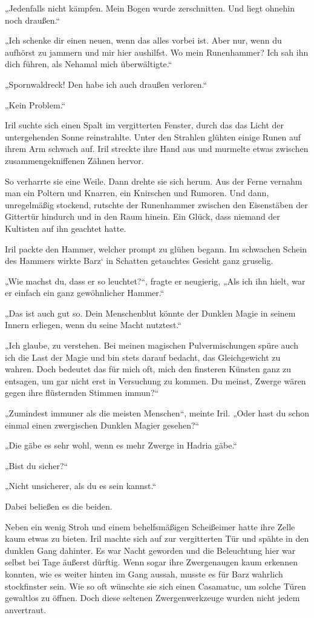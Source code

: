 „Jedenfalls nicht kämpfen. Mein Bogen wurde zerschnitten. Und liegt ohnehin noch draußen.“

„Ich schenke dir einen neuen, wenn das alles vorbei ist. Aber nur, wenn du aufhörst zu jammern und mir hier aushilfst. Wo mein Runenhammer? Ich sah ihn dich führen, als Nehamal mich überwältigte.“

„Spornwaldreck! Den habe ich auch draußen verloren.“

„Kein Problem.“

Iril suchte sich einen Spalt im vergitterten Fenster, durch das das Licht der untergehenden Sonne reinstrahlte. Unter den Strahlen glühten einige Runen auf ihrem Arm schwach auf. Iril streckte ihre Hand aus und murmelte etwas zwischen zusammengekniffenen Zähnen hervor.

So verharrte sie eine Weile. Dann drehte sie sich herum. Aus der Ferne vernahm man ein Poltern und Knarren, ein Knirschen und Rumoren. Und dann, unregelmäßig stockend, rutschte der Runenhammer zwischen den Eisenstäben der Gittertür hindurch und in den Raum hinein. Ein Glück, dass niemand der Kultisten auf ihn geachtet hatte.

Iril packte den Hammer, welcher prompt zu glühen begann. Im schwachen Schein des Hammers wirkte Barz‘ in Schatten getauchtes Gesicht ganz gruselig.

„Wie machst du, dass er so leuchtet?“, fragte er neugierig, „Als ich ihn hielt, war er einfach ein ganz gewöhnlicher Hammer.“

„Das ist auch gut so. Dein Menschenblut könnte der Dunklen Magie in seinem Innern erliegen, wenn du seine Macht nutztest.“

„Ich glaube, zu verstehen. Bei meinen magischen Pulvermischungen spüre auch ich die Last der Magie und bin stets darauf bedacht, das Gleichgewicht zu wahren. Doch bedeutet das für mich oft, mich den finsteren Künsten ganz zu entsagen, um gar nicht erst in Versuchung zu kommen. Du meinst, Zwerge wären gegen ihre flüsternden Stimmen immun?“

„Zumindest immuner als die meisten Menschen“, meinte Iril. „Oder hast du schon einmal einen zwergischen Dunklen Magier gesehen?“

„Die gäbe es sehr wohl, wenn es mehr Zwerge in Hadria gäbe.“

„Bist du sicher?“

„Nicht unsicherer, als du es sein kannst.“

Dabei beließen es die beiden.

Neben ein wenig Stroh und einem behelfsmäßigen Scheißeimer hatte ihre Zelle kaum etwas zu bieten. Iril machte sich auf zur vergitterten Tür und spähte in den dunklen Gang dahinter. Es war Nacht geworden und die Beleuchtung hier war selbst bei Tage äußerst dürftig. Wenn sogar ihre Zwergenaugen kaum erkennen konnten, wie es weiter hinten im Gang aussah, musste es für Barz wahrlich stockfinster sein. Wie so oft wünschte sie sich einen Casamatuc, um solche Türen gewaltlos zu öffnen. Doch diese seltenen Zwergenwerkzeuge wurden nicht jedem anvertraut.

